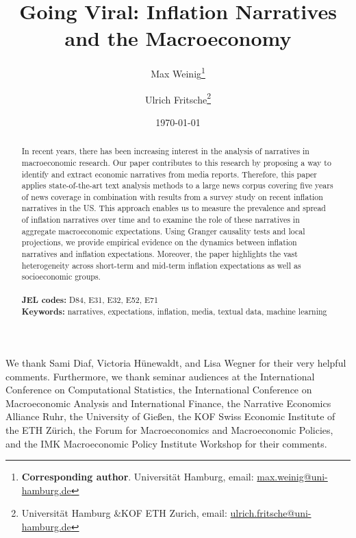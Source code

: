 \documentclass[a4paper, 12pt]{article}
\newenvironment{customabstract}
{\begin{center}\begin{minipage}{0.85\textwidth}}
		{\end{minipage}\end{center}}
\begin{document}
	

\title{Going Viral: Inflation Narratives and the Macroeconomy}
\author{Max Weinig\footnote{\textbf{Corresponding author}. Universität Hamburg, email:  \href{mailto:max.weinig@uni-hamburg.de}{max.weinig@uni-hamburg.de}} \and Ulrich Fritsche\footnote{Universität Hamburg \&KOF ETH Zurich, email: \href{mailto:ulrich.fritsche@uni-hamburg.de}{ulrich.fritsche@uni-hamburg.de}}}
\date{\today}

\maketitle

\begin{abstract}
    \noindent In recent years, there has been increasing interest in the analysis of narratives in macroeconomic research. Our paper contributes to this research by proposing a way to identify and extract economic narratives from media reports. Therefore, this paper applies state-of-the-art text analysis methods to a large news corpus covering five years of news coverage in combination with results from a survey study on recent inflation narratives \citep{Andre.2023} in the US. This approach enables us to measure the prevalence and spread of inflation narratives over time and to examine the role of these narratives in aggregate macroeconomic expectations. Using Granger causality tests and local projections, we provide empirical evidence on the dynamics between inflation narratives and inflation expectations. Moreover, the paper highlights the vast heterogeneity across short-term and mid-term inflation expectations as well as socioeconomic groups. \\
    \\
    \textbf{JEL codes:} D84, E31, E32, E52, E71\\
    \textbf{Keywords:} narratives, expectations, inflation, media, textual data, machine learning
\end{abstract}
\vspace{4cm}
\begin{customabstract}
 \footnotesize
	 \noindent We thank Sami Diaf, Victoria Hünewaldt, and Lisa Wegner for their very helpful comments. Furthermore, we thank seminar audiences at the International Conference on Computational Statistics, the International Conference on Macroeconomic Analysis and International Finance, the Narrative Economics Alliance Ruhr, the University of Gießen, the KOF Swiss Economic Institute of the ETH Zürich, the Forum for Macroeconomics and Macroeconomic Policies, and the IMK Macroeconomic Policy Institute Workshop for their comments. 
	
\end{customabstract}
\end{document}
